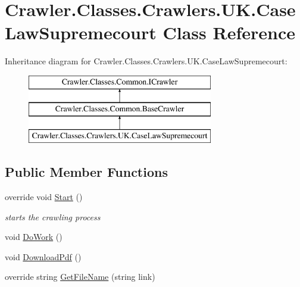 \hypertarget{class_crawler_1_1_classes_1_1_crawlers_1_1_u_k_1_1_case_law_supremecourt}{\section{Crawler.\-Classes.\-Crawlers.\-U\-K.\-Case\-Law\-Supremecourt Class Reference}
\label{class_crawler_1_1_classes_1_1_crawlers_1_1_u_k_1_1_case_law_supremecourt}
}
Inheritance diagram for Crawler.\-Classes.\-Crawlers.\-U\-K.\-Case\-Law\-Supremecourt\-:\begin{figure}[H]
\begin{center}
\leavevmode
\includegraphics[height=3.000000cm]{class_crawler_1_1_classes_1_1_crawlers_1_1_u_k_1_1_case_law_supremecourt}
\end{center}
\end{figure}
\subsection*{Public Member Functions}
\begin{DoxyCompactItemize}
\item 
override void \hyperlink{class_crawler_1_1_classes_1_1_crawlers_1_1_u_k_1_1_case_law_supremecourt_adb1a283c34de4cec5c098ba8978e5a3d}{Start} ()
\begin{DoxyCompactList}\small\item\em starts the crawling process \end{DoxyCompactList}\item 
void \hyperlink{class_crawler_1_1_classes_1_1_crawlers_1_1_u_k_1_1_case_law_supremecourt_a5a3fe052bbf9fcea2a7a519350db045c}{Do\-Work} ()
\item 
void \hyperlink{class_crawler_1_1_classes_1_1_crawlers_1_1_u_k_1_1_case_law_supremecourt_a660459d33580556fb4f1583fe3701fe0}{Download\-Pdf} ()
\item 
override string \hyperlink{class_crawler_1_1_classes_1_1_crawlers_1_1_u_k_1_1_case_law_supremecourt_a4b6555337af8eda1d030d6eb33e550e1}{Get\-File\-Name} (string link)
\end{DoxyCompactItemize}
